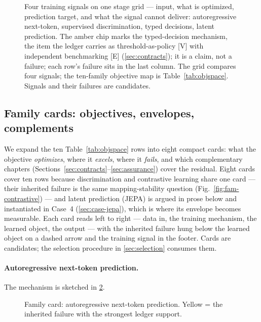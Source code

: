 \documentclass[11pt]{article}
\begin{document}
\begin{figure}[t]
  \centering
  \resizebox{\linewidth}{!}{}
  \caption{ Four training signals on one stage grid --- input, what is optimized, prediction target, and what the signal cannot deliver: autoregressive next-token, supervised discrimination, typed decisions, latent prediction. The amber chip marks the typed-decision mechanism, the item the ledger carries as threshold-as-policy [V] with independent benchmarking [E] (\cref{sec:contracts}); it is a claim, not a failure; each row's failure sits in the last column. The grid compares four signals; the ten-family objective map is Table~\ref{tab:objspace}. Signals and their failures are candidates.}
  \label{fig:signals}
\end{figure}

\subsection{Family cards: objectives, envelopes, complements}
\label{sec:familycards}

We expand the ten Table~\ref{tab:objspace} rows into eight compact cards: what the objective
\emph{optimizes}, where it \emph{excels}, where it \emph{fails}, and which complementary chapters (Sections~\ref{sec:contracts}--\ref{sec:assurance}) cover the residual. Eight cards cover ten rows because discrimination and contrastive learning share one card --- their inherited failure is the same mapping-stability question (Fig.~\ref{fig:fam-contrastive}) --- and latent prediction (JEPA) is argued in prose below and instantiated in Case~4 (\cref{sec:case-jepa}), which is where its envelope becomes measurable. Each card reads left to right --- data in, the training mechanism, the learned object, the output --- with the inherited failure hung below the learned object on a dashed arrow and the training signal in the footer. Cards are
candidates; the selection procedure in \cref{sec:selection} consumes them.

\paragraph{Autoregressive next-token prediction.}
\noindent The mechanism is sketched in \cref{fig:fam-ar}.

\begin{figure}[t]\centering
  \resizebox{\linewidth}{!}{}
  \caption{Family card: autoregressive next-token prediction. Yellow = the inherited failure with the strongest ledger support.}
  \label{fig:fam-ar}
\end{figure}
\end{document}
